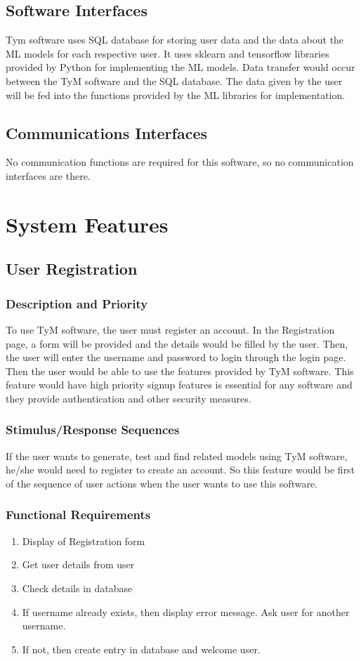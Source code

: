 \documentclass{scrreprt}
\begin{document}
\section{Software Interfaces}
Tym software uses SQL database for storing user data and the data about the ML models for each respective user. It uses sklearn and tensorflow libraries provided by Python for implementing the ML models. Data transfer would occur between the TyM software and the SQL database. The data given by the user will be fed into the functions provided by the ML libraries for implementation. 

\section{Communications Interfaces}
No communication functions are required for this software, so no communication interfaces are there.


\chapter{System Features}


\section{User Registration}

\subsection{Description and Priority}
To use TyM software, the user must register an account. In the Registration page, a form will be provided and the details would be filled by the user. Then, the user will enter the username and password to login through the login page. Then the user would be able to use the features provided by TyM software. This feature would have high priority signup features is essential for any software and they provide authentication and other security measures.

\subsection{Stimulus/Response Sequences}
If the user wants to generate, test and find related models using TyM software, he/she would need to register to create an account. So this feature would be first of the sequence of user actions when the user wants to use this software.  

\subsection{Functional Requirements}
\begin{enumerate}
\item Display of Registration form
\item Get user details from user
\item Check details in database
\item If username already exists, then display error message. Ask user for another username.
\item If not, then create entry in database and welcome user.
\end{enumerate}
\end{document}
